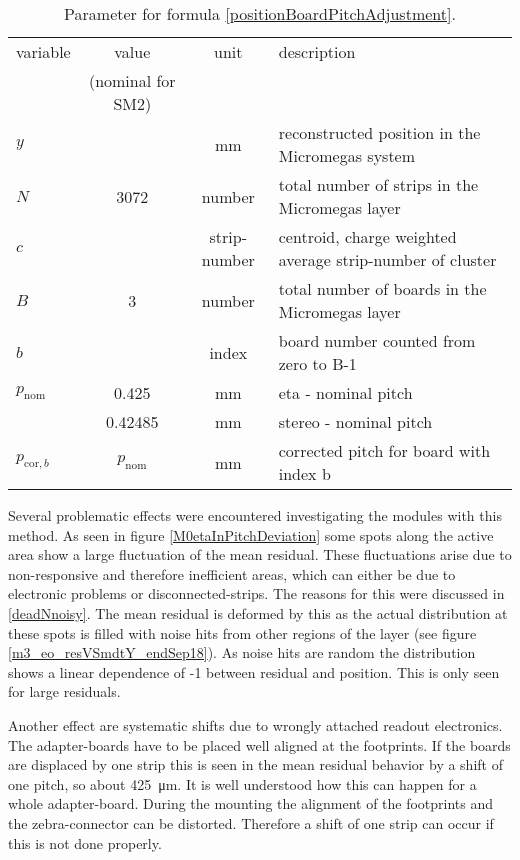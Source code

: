 \documentclass[
twoside,            %
BCOR1.4cm,          %
10pt,               %
headings=normal,    %
headsepline,        %
clearplainpage,		%
final,              %
div=14,
open=right,
bibliography=toc
]{scrreprt}
\begin{document}
\begin{table}[!h]
	\begin{tabular}{lccl}
		\hline
		\hline
		variable & value & unit & description
		\\
		 & (nominal for SM2) &  & 
		\\
		\hline
		$y$ &  & mm & reconstructed position in the Micromegas system
		\\
		$N$ & 3072 & number & total number of strips in the Micromegas layer
		\\
		$c$ &  & strip-number & centroid, charge weighted average strip-number of cluster
		\\
		$B$ & 3 & number & total number of boards in the Micromegas layer
		\\
		$b$ & & index & board number counted from zero to B-1
		\\
		$p_{\mathrm{nom}}$ & 0.425 & mm & eta - nominal pitch
		\\
		 & 0.42485 & mm & stereo - nominal pitch
		\\
		$p_{\mathrm{cor},b}$ & $p_{\mathrm{nom}}$ & mm & corrected pitch for board with index b
		\\
		\hline
		\hline
	\end{tabular}
	\vspace{-2mm}
	\caption{
		Parameter for formula \ref{positionBoardPitchAdjustment}.
	}
	\vspace{-2mm}
\end{table}

Several problematic effects were encountered investigating the modules with this method.
As seen in figure \ref{M0etaInPitchDeviation} some spots along the active area show a large fluctuation of the mean residual.
These fluctuations arise due to non-responsive and therefore inefficient areas, which can either be due to electronic problems or disconnected-strips.
The reasons for this were discussed in \ref{deadNnoisy}.
The mean residual is deformed by this as the actual distribution at these spots is filled with noise hits from other regions of the layer (see figure \ref{m3_eo_resVSmdtY_endSep18}).
As noise hits are random the distribution shows a linear dependence of -1 between residual and position.
This is only seen for large residuals.

Another effect are systematic shifts due to wrongly attached readout electronics.
The adapter-boards have to be placed well aligned at the footprints.
If the boards are displaced by one strip this is seen in the mean residual behavior by a shift of one pitch, so about \SI{425}{\micro m}.
It is well understood how this can happen for a whole adapter-board.
During the mounting the alignment of the footprints and the zebra-connector can be distorted.
Therefore a shift of one strip can occur if this is not done properly.
\end{document}
